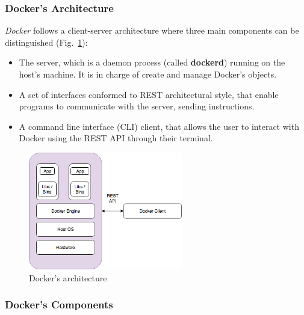 \documentclass[a4paper,12pt]{article}
\def\myfig#1{Fig.~#1\xspace}
\begin{document}
\subsubsection{Docker's Architecture}

\textit{Docker} follows a client-server architecture where three main components
can be distinguished \cite{docker_architecture}
(\myfig{\ref{fig:docker-architecture}}):
\begin{itemize}
  \item The server, which is a daemon process (called \textbf{dockerd}) running
  on the host's machine. It is in charge of create and manage Docker's objects.
  \item A set of interfaces conformed to REST architectural style, that enable
  programs to communicate with the server, sending instructions.
  \item A command line interface (CLI) client, that allows the user to interact
  with Docker using the REST API through their terminal. 
\end{itemize}   

\begin{figure}[ht!]
  \centerline{\includegraphics[width=0.6\textwidth]{docker_architecture.png}}
  \caption{Docker's architecture}
  \label{fig:docker-architecture}
  \end{figure}

\subsubsection{Docker's Components}
\label{sec:docker_object}
\end{document}
